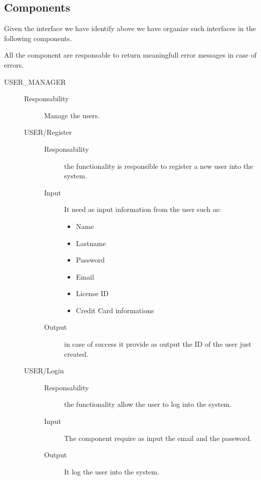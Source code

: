 \documentclass[11pt]{article} %
\begin{document}
\subsection{Components}

Given the interface we have identify above we have organize such interfaces in the following components.

All the component are responsable to return meaningfull error messages in case of errors.

\begin{description}
	\item[USER\_MANAGER] \hfill
	\begin{description}
		\item[Responsability] Manage the users.
	\item[USER/Register] \hfill
		\begin{description}
			\item[Responsability] the functionality is responsible to register a new user into the system.
			\item[Input] It need as input information from the user such as:
				\begin{itemize}
					\item Name
					\item Lastname
					\item Password
					\item Email
					\item License ID
					\item Credit Card informations
				\end{itemize}
			\item[Output] in case of success it provide as output the ID of the user just created.
		\end{description}
	\item[USER/Login] \hfill
		\begin{description}
			\item[Responsability] the functionality allow the user to log into the system.
			\item[Input] The component require as input the email and the password.
			\item[Output] It log the user into the system.
		\end{description}
	\end{description}
	

\end{description}
\end{document}
